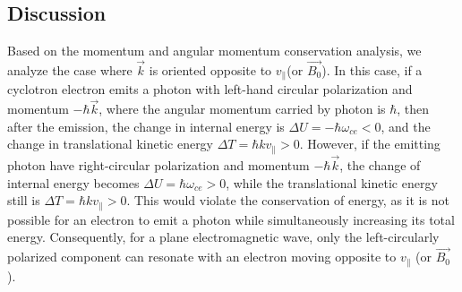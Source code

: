 \documentclass{cpbtex}
\begin{document}
\begin{CJK*}{GBK}{song}
\section{Discussion }
Based on the momentum and angular momentum conservation analysis, we analyze the case where $\vec{k}$ is oriented opposite to $v_{\parallel}$(or $\vec{B_0}$). In this case, if a cyclotron electron emits a photon with left-hand circular polarization and momentum $-\hbar\vec{k}$, where the angular momentum carried by photon is $\hbar$, then after the emission, the change in internal energy is $\Delta U = -\hbar\omega_{ce}<0$, and the change in translational kinetic energy $\Delta T = \hbar k v_{\parallel}>0$. However, if the emitting photon have right-circular polarization and momentum $-\hbar\vec{k}$, the change of internal energy becomes $\Delta U = \hbar\omega_{ce}>0$, while the translational kinetic energy still is $\Delta T = \hbar k v_{\parallel}>0$. This would violate the conservation of energy, as it is not possible for an electron to emit a photon while simultaneously increasing its total energy. Consequently, for a plane electromagnetic wave, only the left-circularly polarized component can resonate with an electron moving opposite to $v_{\parallel}$ (or $\vec{B_0}$). 
%
%

\end{CJK*}
\end{document}
